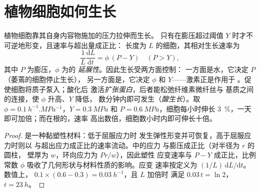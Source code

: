 \section{植物细胞如何生长}

\begin{theorem}[洛克哈特方程]\label{thm:b2:plant-meristems:lockhart}
植物细胞靠其自身内容物施加的压力拉伸而生长。
只有在膨压超过阈值
$Y$ 时才不可逆地形变，且速率与超出量成正比：
长度为 $L$ 的细胞，其相对生长速率为
\[
\frac{1}{L}\frac{\mathrm{d}L}{\mathrm{d}t} = \phi\,(P - Y) \quad (P > Y),
\]
其中 $P$ 为膨压，$\phi$ 为的
\emph{延展性}。因此生长受两方面控制：
一方面是水，它决定 $P$（萎蔫的细胞停止生长），
另一方面是，它决定 $\phi$ 和 $Y$——激素正是作用于
。促使细胞将质子泵入；酸化后
激活\emph{扩张蛋白}，后者能松弛纤维素微纤丝与
基质之间的连接，使 $\phi$ 升高、$Y$ 降低，
数分钟内即可发生（\emph{酸生长}）。取 $\phi =
\qty{0.1}{h^{-1}.MPa^{-1}}$，$Y = \qty{0.3}{MPa}$ 和 $P =
\qty{0.6}{MPa}$，细胞每小时伸长 \qty{3}{\%}，一天
即可加倍；而在根的，速率
高出数倍，细胞数小时内即可伸长十倍。
\end{theorem}
\begin{proof}
是一种黏塑性材料：低于屈服应力时
发生弹性形变并可恢复，高于屈服应力时则以
与超出应力成正比的速率流动。中的应力
与膨压成正比（对半径为 $r$ 的圆柱，
壁厚为 $w$，环向应力为 $Pr/w$），因此塑性
应变速率与 $P - Y$ 成正比，比例常数 $\phi$
吸收了几何形状与材料性质的影响。应变
速率按定义为 $(1/L)\,\mathrm{d}L/\mathrm{d}t$。数值上，
$0.1\times(0.6 - 0.3) = \qty{0.03}{h^{-1}}$，且 $L$ 加倍时
满足 $0.03\,t = \ln 2$，$t = \qty{23}{h}$。
\end{proof}

